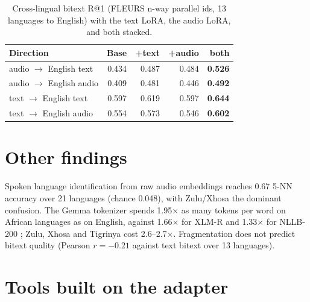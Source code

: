 \documentclass[conference]{IEEEtran}
\makeatletter
\newcommand{\rone}{R@1}
\makeatother
\begin{document}
\begin{table}[t]
  \centering
  \caption{Cross-lingual bitext \rone{} (FLEURS n-way parallel ids, 13
  languages to English) with the text LoRA, the audio LoRA, and both stacked.}
  \label{tab:xling}
  \small
  \setlength{\tabcolsep}{4pt}
  \begin{tabular}{lrrrr}
    \toprule
    Direction & Base & +text & +audio & both \\
    \midrule
    audio $\to$ English text  & 0.434 & 0.487 & 0.484 & \textbf{0.526} \\
    audio $\to$ English audio & 0.409 & 0.481 & 0.446 & \textbf{0.492} \\
    text $\to$ English text   & 0.597 & 0.619 & 0.597 & \textbf{0.644} \\
    text $\to$ English audio  & 0.554 & 0.573 & 0.546 & \textbf{0.602} \\
    \bottomrule
  \end{tabular}
\end{table}

\section{Other findings}

Spoken language identification from raw audio embeddings reaches 0.67 5-NN accuracy over 21 languages (chance 0.048), with Zulu/Xhosa the dominant
confusion. The Gemma tokenizer spends 1.95$\times$ as many tokens per word on
African languages as on English, against 1.66$\times$ for XLM-R
\cite{conneau2020xlmr} and 1.33$\times$ for NLLB-200 \cite{nllb2022}; Zulu,
Xhosa and Tigrinya cost 2.6--2.7$\times$. Fragmentation does not predict bitext quality (Pearson $r=-0.21$ against text bitext over 13 languages).

\section{Tools built on the adapter}
\label{sec:tools}
\end{document}
